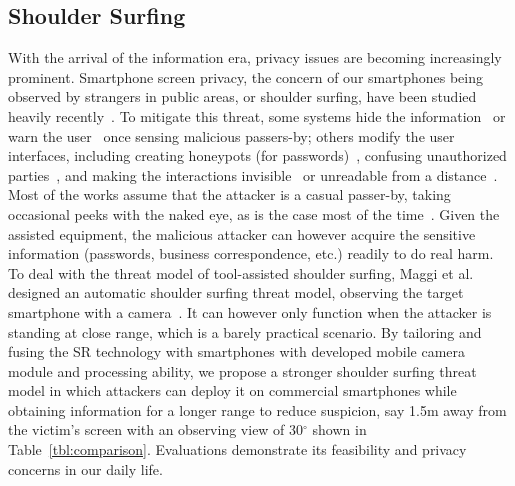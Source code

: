 \subsection{Shoulder Surfing}
With the arrival of the information era, privacy issues are becoming increasingly prominent. Smartphone screen privacy, the concern of our smartphones being observed by strangers in public areas, or shoulder surfing, have been studied heavily recently~\cite{eiband2017understanding,goucher2011look,kwon2013covert}. To mitigate this threat, some systems hide the information~\cite{brudy2014anyone} or warn the user~\cite{saad2018communicating} once sensing malicious passers-by; others modify the user interfaces, including creating honeypots (for passwords)~\cite{chakraborty2014tag}, confusing unauthorized parties~\cite{wiedenbeck2006design}, and making the interactions invisible~\cite{kumar2007reducing} or unreadable from a distance~\cite{Chun2019Keep}. Most of the works assume that the attacker is a casual passer-by, taking occasional peeks with the naked eye, as is the case most of the time~\cite{eiband2017understanding}. Given the assisted equipment, the malicious attacker can however acquire the sensitive information (passwords, business correspondence, etc.) readily to do real harm. To deal with the threat model of tool-assisted shoulder surfing,
Maggi et al. designed an automatic shoulder surfing threat model, observing the target smartphone with a camera~\cite{maggi2011poster}. It can however only function when the attacker is standing at close range, which is a barely practical scenario. By tailoring and fusing the SR technology with smartphones with developed mobile camera module and processing ability, we propose a stronger shoulder surfing threat model in which attackers can deploy it on commercial smartphones while obtaining information for a longer range to reduce suspicion, say 1.5m away from the victim's screen with an observing view of 30$^\circ$ shown in Table~\ref{tbl:comparison}. Evaluations demonstrate its feasibility and privacy concerns in our daily life.

